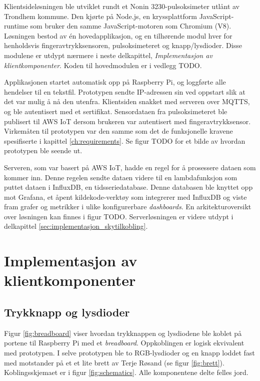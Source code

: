 Klientsideløsningen ble utviklet rundt
et Nonin 3230-pulsoksimeter utlånt av Trondhem kommune. Den kjørte på Node.js, en kryssplattform JavaScript-runtime som bruker den
samme JavaScript-motoren som Chromium (V8). Løsningen bestod av én hovedapplikasjon, og en tilhørende modul hver for henholdsvis fingeravtrykksensoren,
pulsoksimeteret og knapp/lysdioder. Disse modulene er utdypt nærmere i neste delkapittel, \textit{Implementasjon av klientkomponenter}.
Koden til hovedmodulen er i vedlegg TODO.

Applikasjonen startet automatisk opp på Raspberry Pi, og loggførte alle hendelser til en tekstfil.
Prototypen sendte IP-adressen sin ved oppstart slik at det var mulig å nå den utenfra.
Klientsiden snakket med serveren over MQTTS, og ble autentisert med et sertifikat. Sensordataen fra pulsoksimeteret ble publisert til
AWS IoT dersom brukeren var autentisert med fingeravtrykksensor. Virkemåten til prototypen var den samme som det de funksjonelle
kravene spesifiserte i kapittel \ref{ch:requirements}. Se figur TODO for et bilde av hvordan prototypen ble seende ut.

Serveren, som var basert på AWS IoT, hadde en
regel for å prosessere dataen som kommer inn. Denne regelen sendte dataen videre til en lambdafunksjon som puttet dataen
i InfluxDB, en tidsseriedatabase. Denne databasen ble knyttet opp mot Grafana, et åpent kildekode-verktøy som integrerer
med InfluxDB og viste fram grafer og metrikker i ulike konfigurerbare \textit{dashboards}. En arkitekturoversikt over løsningen
kan finnes i figur TODO. Serverløsningen er videre utdypt i delkapittel \ref{sec:implementasjon_skytilkobling}.

\section{Implementasjon av klientkomponenter}

\subsection{Trykknapp og lysdioder}
Figur \ref{fig:breadboard} viser hvordan trykknappen og lysdiodene ble koblet på
portene til Raspberry Pi med et \textit{breadboard}. Oppkoblingen er logisk ekvivalent med prototypen.
I selve prototypen ble to RGB-lysdioder og en knapp loddet fast med motstander på et et lite brett av Terje Røsand (se figur \ref{fig:brett}).
Koblingsskjemaet er i figur \ref{fig:schematics}. Alle komponentene delte felles jord.

